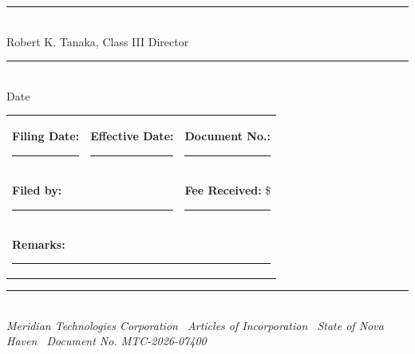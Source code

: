 \documentclass[12pt,a4paper]{scrartcl}
\begin{document}
\par
\vspace{10pt}

\noindent\begin{minipage}[t]{0.48\linewidth}
\begin{tcolorbox}[signbox]
  \vspace{4pt}
  \rule{\linewidth}{0.4pt}\\[-2pt]
  {\small\color{SlateGray}Robert K. Tanaka, Class III Director}\\[14pt]
  \rule{\linewidth}{0.4pt}\\[-2pt]
  {\small\color{SlateGray}Date}
\end{tcolorbox}
\end{minipage}

\vspace{18pt}

\begin{tcolorbox}[
  enhanced,
  colback=NavyDeep!5!white,
  colframe=NavyDeep,
  arc=2pt, boxrule=1pt,
  left=12pt, right=12pt, top=10pt, bottom=10pt,
  title={\color{white}\bfseries\small FOR SECRETARY OF STATE USE ONLY},
  attach boxed title to top left={yshift=-3mm, xshift=8mm},
  boxed title style={colback=NavyDeep, colframe=NavyDeep, arc=2pt, boxrule=0pt,
    left=6pt, right=6pt, top=2pt, bottom=2pt},
]
\vspace{6pt}
\noindent\begin{tabularx}{\linewidth}{@{} X X X @{}}
  \textbf{Filing Date:} \rule{2cm}{0.3pt} &
  \textbf{Effective Date:} \rule{2cm}{0.3pt} &
  \textbf{Document No.:} \rule{2cm}{0.3pt} \\[12pt]
  \multicolumn{2}{l}{\textbf{Filed by:} \rule{5cm}{0.3pt}} &
  \textbf{Fee Received:} \$\rule{1.8cm}{0.3pt} \\[12pt]
  \multicolumn{3}{l}{\textbf{Remarks:} \rule{11cm}{0.3pt}} \\
\end{tabularx}
\vspace{4pt}
\end{tcolorbox}

\vspace{10pt}
\begin{center}
  {\color{RuleGray}\rule{0.4\linewidth}{0.4pt}}\\[4pt]
  {\small\color{SlateGray}\itshape
   Meridian Technologies Corporation \textbullet\
   Articles of Incorporation \textbullet\
   State of Nova Haven \textbullet\
   Document No. MTC-2026-07400}
\end{center}
\end{document}
